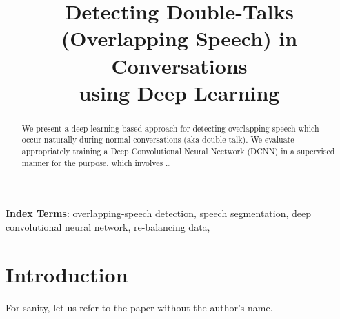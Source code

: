 \documentclass[a4paper]{article}
\title{
       Detecting Double-Talks (Overlapping Speech) in Conversations\\
       using Deep Learning
}
\begin{document}
\maketitle

\begin{abstract}
We present a deep learning based approach for detecting overlapping speech which occur naturally during normal conversations (aka double-talk).
We evaluate appropriately training a Deep Convolutional Neural Nectwork (DCNN) in a supervised manner for the purpose,
which involves \ldots

\end{abstract}

\noindent\textbf{Index Terms}:
overlapping-speech detection,
speech segmentation,
deep convolutional neural network,
re-balancing data,

\section{Introduction}
For sanity, let us refer to the paper \cite{rabiner_tutorial_1989} without the author's name.




\end{document}
